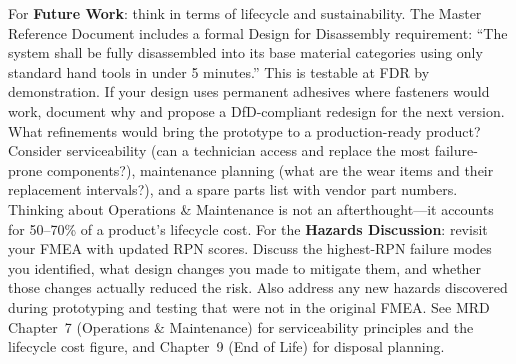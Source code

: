 \documentclass[11pt,letterpaper]{article}
\begin{document}
\begin{faqbox}
For \textbf{Future Work}: think in terms of lifecycle and sustainability. The Master Reference Document includes a formal Design for Disassembly requirement: ``The system shall be fully disassembled into its base material categories using only standard hand tools in under 5 minutes.'' This is testable at FDR by demonstration. If your design uses permanent adhesives where fasteners would work, document why and propose a DfD-compliant redesign for the next version. What refinements would bring the prototype to a production-ready product? Consider serviceability (can a technician access and replace the most failure-prone components?), maintenance planning (what are the wear items and their replacement intervals?), and a spare parts list with vendor part numbers. Thinking about Operations \& Maintenance is not an afterthought---it accounts for 50--70\% of a product's lifecycle cost. For the \textbf{Hazards Discussion}: revisit your FMEA with updated RPN scores. Discuss the highest-RPN failure modes you identified, what design changes you made to mitigate them, and whether those changes actually reduced the risk. Also address any new hazards discovered during prototyping and testing that were not in the original FMEA. See MRD Chapter~7 (Operations \& Maintenance) for serviceability principles and the lifecycle cost figure, and Chapter~9 (End of Life) for disposal planning.
\end{faqbox}
\end{document}
